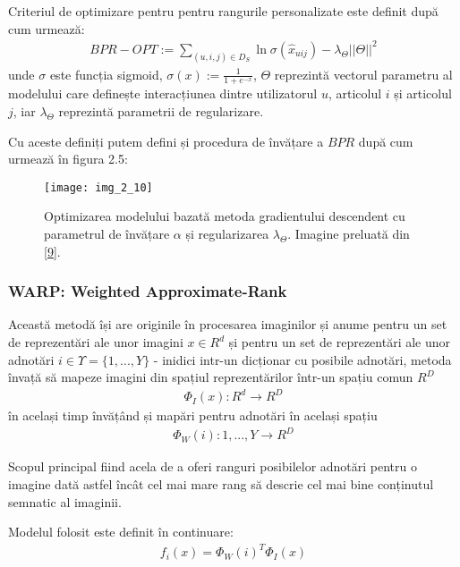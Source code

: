 Criteriul de optimizare pentru pentru rangurile personalizate este definit după cum urmează:
\begin{align}
	BPR-OPT := \sum_{(u,i,j) \in D_S} \ln{\sigma(\hat{x}_{uij})} - \lambda_\Theta||\Theta||^2
\end{align}
unde $\sigma$ este funcția sigmoid, $\sigma(x) := \frac{1}{1+e^{-x}}$, $\Theta$ reprezintă vectorul parametru al modelului care definește interacțiunea dintre utilizatorul $u$, articolul $i$ și articolul $j$, iar $\lambda_\Theta$ reprezintă parametrii de regularizare.

Cu aceste definiți putem defini și procedura de învățare a $BPR$ după cum urmează în figura 2.5:
\begin{figure}[!h]
	\centering
	\texttt{[image: img\_2\_10]}
	\caption[Procedura de învățarea BPR]{Optimizarea modelului bazată metoda gradientului descendent cu parametrul de învățare $\alpha$ și regularizarea $\lambda_\Theta$. Imagine preluată din \hyperlink{SteffenRendleChristophFreudenthalerZenoGantnerLarsSchmidtThieme}{[9]}.}
\end{figure}

\vspace{5mm}
\subsubsection*{WARP: Weighted Approximate-Rank}

Această metodă își are originile în procesarea imaginilor și anume pentru un set de reprezentări ale unor imagini $x \in R^d$ și pentru un set de reprezentări ale unor adnotări $i \in \Upsilon = \{1, ..., Y\}$ - inidici intr-un dicționar cu posibile adnotări, metoda învață să mapeze imagini din spațiul reprezentărilor într-un spațiu comun $R^D$
\begin{align}
	\Phi_{I}(x):R^d \rightarrow R^D
\end{align}
în același timp învățând și mapări pentru adnotări în același spațiu
\begin{align}
	\Phi_{W}(i):{1,...,Y} \rightarrow R^D
\end{align}

Scopul principal fiind acela de a oferi ranguri posibilelor adnotări pentru o imagine dată astfel încât cel mai mare rang să descrie cel mai bine conținutul semnatic al imaginii. 

Modelul folosit este definit în continuare:
\begin{align}
	f_{i}(x) = \Phi_{W}(i)^T \Phi_{I}(x)
\end{align}

